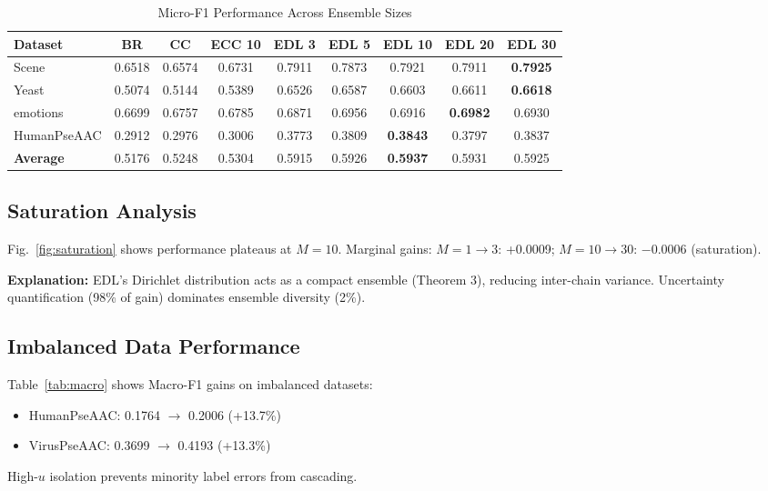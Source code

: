 \documentclass[conference]{IEEEtran}
\begin{document}
\begin{table}[t]
\centering
\caption{Micro-F1 Performance Across Ensemble Sizes}
\label{tab:main_results}
\small
\begin{tabular}{lcccccccc}
\toprule
\textbf{Dataset} & \textbf{BR} & \textbf{CC} & \textbf{ECC 10} & \textbf{EDL 3} & \textbf{EDL 5} & \textbf{EDL 10} & \textbf{EDL 20} & \textbf{EDL 30} \\
\midrule
Scene & 0.6518 & 0.6574 & 0.6731 & 0.7911 & 0.7873 & 0.7921 & 0.7911 & \textbf{0.7925} \\
Yeast & 0.5074 & 0.5144 & 0.5389 & 0.6526 & 0.6587 & 0.6603 & 0.6611 & \textbf{0.6618} \\
emotions & 0.6699 & 0.6757 & 0.6785 & 0.6871 & 0.6956 & 0.6916 & \textbf{0.6982} & 0.6930 \\
HumanPseAAC & 0.2912 & 0.2976 & 0.3006 & 0.3773 & 0.3809 & \textbf{0.3843} & 0.3797 & 0.3837 \\
\midrule
\textbf{Average} & 0.5176 & 0.5248 & 0.5304 & 0.5915 & 0.5926 & \textbf{0.5937} & 0.5931 & 0.5925 \\
\bottomrule
\end{tabular}
\end{table}

\subsection{Saturation Analysis}

Fig.~\ref{fig:saturation} shows performance plateaus at $M=10$. Marginal gains: $M=1 \to 3$: +0.0009; $M=10 \to 30$: $-0.0006$ (saturation).

\textbf{Explanation:} EDL's Dirichlet distribution acts as a compact ensemble (Theorem 3), reducing inter-chain variance. Uncertainty quantification (98\% of gain) dominates ensemble diversity (2\%).

\subsection{Imbalanced Data Performance}

Table~\ref{tab:macro} shows Macro-F1 gains on imbalanced datasets:
\begin{itemize}
\item HumanPseAAC: 0.1764 $\to$ 0.2006 (+13.7\%)
\item VirusPseAAC: 0.3699 $\to$ 0.4193 (+13.3\%)
\end{itemize}

High-$u$ isolation prevents minority label errors from cascading.
\end{document}
